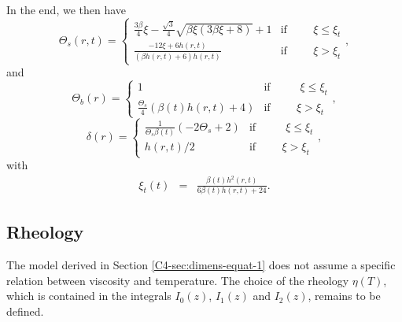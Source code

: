 In the end, we then have
\begin{equation}
  \Theta_s(r,t)=
  \begin{cases}
    \frac{3 \beta}{4} \xi - \frac{\sqrt{3}}{4} \sqrt{\beta \xi \left(3 \beta \xi + 8\right)} + 1 & \text{if} \hspace{1cm} \xi\leq \xi_t \\
    \frac{- 12  \xi +  6 h{\left  (r,t \right  )}}{\left(\beta h{\left
            (r,t  \right  )} +  6\right)  h{\left  (r,t \right  )}}  &
    \text{if} \hspace{1cm} \xi > \xi_t
  \end{cases},
  \label{C4-TS}
\end{equation}
and
\begin{equation}
  \Theta_b(r)=
  \begin{cases}
    1 &\text{if } \hspace{1cm} \xi\leq \xi_t \\
    \frac{\Theta_{s}}{4}  \left(\beta(t)  h{\left  (r,t  \right  )}  +
      4\right) & \text{if} \hspace{1cm} \xi > \xi_t
  \end{cases},
  \label{C4-TB}
\end{equation}
\begin{equation}
  \delta(r)=
  \begin{cases}
    \frac{1}{\Theta_{s} \beta(t)} \left(- 2 \Theta_{s} + 2\right) &\text{if } \hspace{1cm} \xi\leq \xi_t \\
    h(r,t)/2 & \text{if} \hspace{1cm} \xi > \xi_t
  \end{cases},
  \label{C4-DELTA}
\end{equation}
with
\begin{eqnarray}
  \xi_t(t)&=&\frac{\beta(t) h^{2}{\left (r,t \right )}}{6 \beta(t) h{\left (r,t \right )}
              + 24}.
\end{eqnarray}

\subsection{Rheology}
\label{C4-sec:rheology}

The  model derived  in  Section  \ref{C4-sec:dimens-equat-1} does  not
assume  a specific  relation  between viscosity  and temperature.  The
choice of the rheology $\eta(T)$,  which is contained in the integrals
$I_0(z)$, $I_1(z)$ and $I_2(z)$, remains to be defined.  

